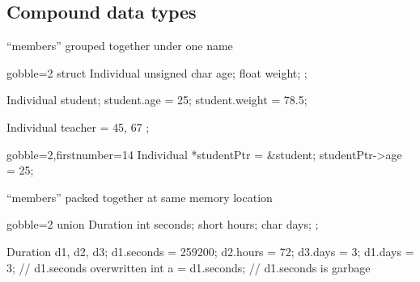 \subsection[Compound]{Compound data types}

\begin{frame}[fragile]
  \begin{mdframed}[style=simplebox]
    \center ``members'' grouped together under one name
  \end{mdframed}
  \begin{multicols}{2}
    \begin{cppcode*}{gobble=2}
      struct Individual {
        unsigned char age;
        float weight;
      };

      Individual student;
      student.age = 25;
      student.weight = 78.5;

      Individual teacher = {
        45, 67
      };
    \end{cppcode*}
    \columnbreak
    \begin{cppcode*}{gobble=2,firstnumber=14}
      Individual *studentPtr =
        &student;
      studentPtr->age = 25;
    \end{cppcode*}
    \pause
    \vfill
    \hspace{-1.5cm}
    \vfill \null
  \end{multicols}
\end{frame}

\begin{frame}[fragile]
  \begin{mdframed}[style=simplebox]
    \center ``members'' packed together at same memory location
  \end{mdframed}
  \begin{multicols}{2}
    \begin{cppcode*}{gobble=2}
      union Duration {
        int seconds;
        short hours;
        char days;
      };

      Duration d1, d2, d3;
      d1.seconds = 259200;
      d2.hours = 72;
      d3.days = 3;
      d1.days = 3; // d1.seconds overwritten
      int a = d1.seconds; // d1.seconds is garbage
    \end{cppcode*}
    \pause
    \columnbreak
    \null \vfill
    \vfill \null
  \end{multicols}
\end{frame}

